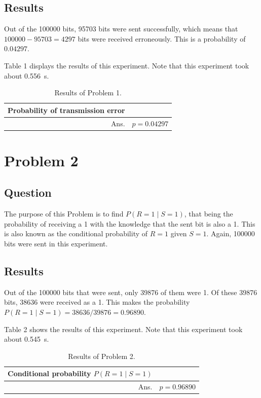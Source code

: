 \documentclass{article}
\begin{document}
\subsection{Results} Out of the \num{100000} bits, \num{95703}
bits were sent successfully, which means that
\(\num{100000} - \num{95703} = \num{4297}\) bits were received
erroneously. This is a probability of \(0.04297\).

Table 1
displays the results of this experiment. Note that this
experiment took about \SI{0.556}{\second}.

\begin{table}[H]
    \centering\begin{tabular}{| r | l |}
        \hline
        Probability of transmission error & \\ \hline
        Ans. & \(p = 0.04297\) \\ \hline
    \end{tabular}
    \caption{Results of Problem 1.}
    \label{table:prob1}
\end{table}

\section{Problem 2}
\subsection{Question} The purpose of this Problem is to find
\(P(R = 1 \mid S = 1)\), that being the probability of
receiving a 1 with the knowledge that the sent bit is also a 1.
This is also known as the conditional probability of
\(R = 1\) given \(S = 1\). Again, \num{100000} bits were sent
in this experiment.

\subsection{Results} Out of the \num{100000} bits that were
sent,
only \num{39876} of them
were 1. Of these \num{39876} bits, \num{38636} were received
as a 1. This makes the probability
\(P(R = 1 \mid S = 1) = \num{38636}/\num{39876} = 0.96890\).

Table 2 shows the results of this experiment.
Note that this experiment took about \SI{0.545}{\second}.

\begin{table}[H]
    \centering\begin{tabular}{|r | l |}
        \hline
        Conditional probability \(P(R = 1 \mid S = 1)\) & \\ \hline
        Ans. & \(p = 0.96890\) \\ \hline
    \end{tabular}
    \caption{Results of Problem 2.}
    \label{table:prob2}
\end{table}
\end{document}
